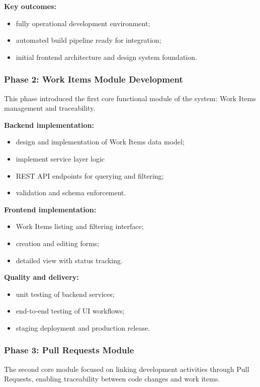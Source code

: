 \textbf{Key outcomes:}
\begin{itemize}
  \item fully operational development environment;
  \item automated build pipeline ready for integration;
  \item initial frontend architecture and design system foundation.
\end{itemize}

\subsubsection{Phase 2: Work Items Module Development}

This phase introduced the first core functional module of the system: Work
Items management and traceability.

\textbf{Backend implementation:}
\begin{itemize}
  \item design and implementation of Work Items data model;
  \item implement service layer logic 
  \item REST API endpoints for querying and filtering;
  \item validation and schema enforcement.
\end{itemize}

\textbf{Frontend implementation:}
\begin{itemize}
  \item Work Items listing and filtering interface;
  \item creation and editing forms;
  \item detailed view with status tracking.
\end{itemize}

\textbf{Quality and delivery:}
\begin{itemize}
  \item unit testing of backend services;
  \item end-to-end testing of UI workflows;
  \item staging deployment and production release.
\end{itemize}

\subsubsection{Phase 3: Pull Requests Module}

The second core module focused on linking development activities through Pull
Requests, enabling traceability between code changes and work items.

